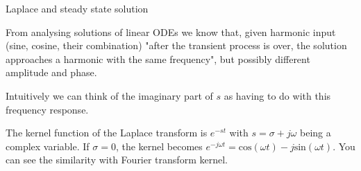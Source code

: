\documentclass{beamer}
\begin{document}
\begin{frame}{Laplace and steady state solution}
	\begin{flushleft}
		
		From analysing solutions of linear ODEs we know that, given harmonic input (sine, cosine, their combination) "after the transient process is over, the solution approaches a harmonic with the same frequency", but possibly different amplitude and phase.
		
		\bigskip
		
		Intuitively we can think of the imaginary part of $s$ as having to do with this frequency response. 
		
		\bigskip
		The kernel function of the Laplace transform is $e^{-st}$ with $s = \sigma + j \omega$ being a complex variable. If $\sigma = 0$, the kernel becomes $e^{-j \omega t} = \text{cos}(\omega t) - j \text{sin}(\omega t)$. You can see the similarity with Fourier transform kernel.
		
		
	\end{flushleft}
\end{frame}
\end{document}
